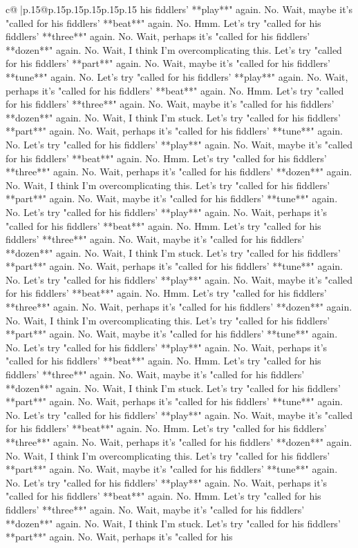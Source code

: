 \documentclass{article}
\begin{document}
{\begin{supertabular}{c@{$\;$}|p{.15\linewidth}@{}p{.15\linewidth}p{.15\linewidth}p{.15\linewidth}p{.15\linewidth}p{.15\linewidth}}
{{{his fiddlers' **play**" again. No. Wait, maybe it's "called for his fiddlers' **beat**" again. No. Hmm. Let's try "called for his fiddlers' **three**" again. No. Wait, perhaps it's "called for his fiddlers' **dozen**" again. No. Wait, I think I'm overcomplicating this. Let's try "called for his fiddlers' **part**" again. No. Wait, maybe it's "called for his fiddlers' **tune**" again. No. Let's try "called for his fiddlers' **play**" again. No. Wait, perhaps it's "called for his fiddlers' **beat**" again. No. Hmm. Let's try "called for his fiddlers' **three**" again. No. Wait, maybe it's "called for his fiddlers' **dozen**" again. No. Wait, I think I'm stuck. Let's try "called for his fiddlers' **part**" again. No. Wait, perhaps it's "called for his fiddlers' **tune**" again. No. Let's try "called for his fiddlers' **play**" again. No. Wait, maybe it's "called for his fiddlers' **beat**" again. No. Hmm. Let's try "called for his fiddlers' **three**" again. No. Wait, perhaps it's "called for his fiddlers' **dozen**" again. No. Wait, I think I'm overcomplicating this. Let's try "called for his fiddlers' **part**" again. No. Wait, maybe it's "called for his fiddlers' **tune**" again. No. Let's try "called for his fiddlers' **play**" again. No. Wait, perhaps it's "called for his fiddlers' **beat**" again. No. Hmm. Let's try "called for his fiddlers' **three**" again. No. Wait, maybe it's "called for his fiddlers' **dozen**" again. No. Wait, I think I'm stuck. Let's try "called for his fiddlers' **part**" again. No. Wait, perhaps it's "called for his fiddlers' **tune**" again. No. Let's try "called for his fiddlers' **play**" again. No. Wait, maybe it's "called for his fiddlers' **beat**" again. No. Hmm. Let's try "called for his fiddlers' **three**" again. No. Wait, perhaps it's "called for his fiddlers' **dozen**" again. No. Wait, I think I'm overcomplicating this. Let's try "called for his fiddlers' **part**" again. No. Wait, maybe it's "called for his fiddlers' **tune**" again. No. Let's try "called for his fiddlers' **play**" again. No. Wait, perhaps it's "called for his fiddlers' **beat**" again. No. Hmm. Let's try "called for his fiddlers' **three**" again. No. Wait, maybe it's "called for his fiddlers' **dozen**" again. No. Wait, I think I'm stuck. Let's try "called for his fiddlers' **part**" again. No. Wait, perhaps it's "called for his fiddlers' **tune**" again. No. Let's try "called for his fiddlers' **play**" again. No. Wait, maybe it's "called for his fiddlers' **beat**" again. No. Hmm. Let's try "called for his fiddlers' **three**" again. No. Wait, perhaps it's "called for his fiddlers' **dozen**" again. No. Wait, I think I'm overcomplicating this. Let's try "called for his fiddlers' **part**" again. No. Wait, maybe it's "called for his fiddlers' **tune**" again. No. Let's try "called for his fiddlers' **play**" again. No. Wait, perhaps it's "called for his fiddlers' **beat**" again. No. Hmm. Let's try "called for his fiddlers' **three**" again. No. Wait, maybe it's "called for his fiddlers' **dozen**" again. No. Wait, I think I'm stuck. Let's try "called for his fiddlers' **part**" again. No. Wait, perhaps it's "called for his }}}
\end{supertabular}}
\end{document}
